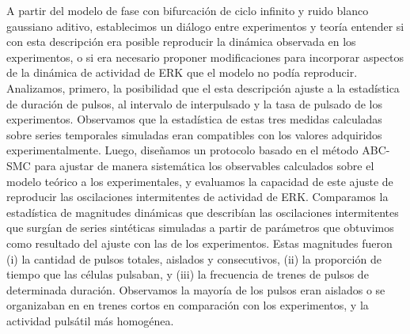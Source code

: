 \documentclass[./main.tex]{subfiles}
\begin{document}
A partir del modelo de fase con bifurcación de ciclo infinito y ruido blanco gaussiano aditivo, establecimos un diálogo entre experimentos y teoría entender si con esta descripción era posible reproducir la dinámica observada en los experimentos, o si era necesario proponer modificaciones para incorporar aspectos de la dinámica de actividad de ERK que el modelo no podía reproducir. Analizamos, primero, la posibilidad que el esta descripción ajuste a la estadística de duración de pulsos, al intervalo de interpulsado y la tasa de pulsado de los experimentos. Observamos que la estadística de estas tres medidas calculadas sobre series temporales simuladas eran compatibles con los valores adquiridos experimentalmente. Luego, diseñamos un protocolo basado en el método ABC-SMC para ajustar de manera sistemática los observables calculados sobre el modelo teórico a los experimentales, y evaluamos la capacidad de este ajuste de reproducir las oscilaciones intermitentes de actividad de ERK. Comparamos la estadística de magnitudes dinámicas que describían las oscilaciones intermitentes que surgían de series sintéticas simuladas a partir de parámetros que obtuvimos como resultado del ajuste con las de los experimentos. Estas magnitudes fueron (i) la cantidad de pulsos totales, aislados y consecutivos, (ii) la proporción de tiempo que las células pulsaban, y (iii) la frecuencia de trenes de pulsos de determinada duración. Observamos la mayoría de los pulsos eran aislados o se organizaban en en trenes cortos en comparación con los experimentos, y la actividad pulsátil más homogénea. 
\end{document}
